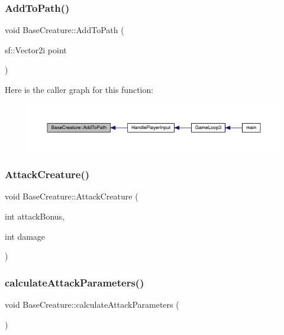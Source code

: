 \subsubsection{\texorpdfstring{Add\+To\+Path()}{AddToPath()}}
{\footnotesize\ttfamily void Base\+Creature\+::\+Add\+To\+Path (\begin{DoxyParamCaption}\item[{sf\+::\+Vector2i}]{point }\end{DoxyParamCaption})}

Here is the caller graph for this function\+:
\nopagebreak
\begin{figure}[H]
\begin{center}
\leavevmode
\includegraphics[width=350pt]{class_base_creature_aa18f395754df39095f993e6805ef37a8_icgraph}
\end{center}
\end{figure}
\mbox{\label{class_base_creature_a63f43a7153eee3c1032b02f6d1948cdb}} 
\subsubsection{\texorpdfstring{Attack\+Creature()}{AttackCreature()}}
{\footnotesize\ttfamily void Base\+Creature\+::\+Attack\+Creature (\begin{DoxyParamCaption}\item[{int}]{attack\+Bonus,  }\item[{int}]{damage }\end{DoxyParamCaption})}

\mbox{\label{class_base_creature_a389d8ae4c4caa2d7c55939bef70935a8}} 
\subsubsection{\texorpdfstring{calculate\+Attack\+Parameters()}{calculateAttackParameters()}}
{\footnotesize\ttfamily void Base\+Creature\+::calculate\+Attack\+Parameters (\begin{DoxyParamCaption}{ }\end{DoxyParamCaption})}

